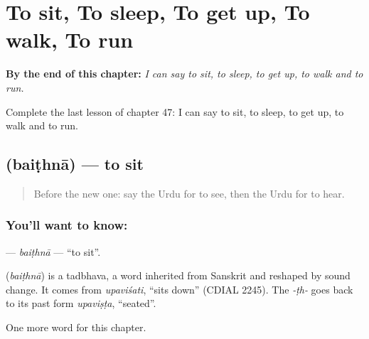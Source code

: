 
\chapter{To sit, To sleep, To get up, To walk, To run}
\label{ch:ur-to-sit-to-sleep-to-get-up-to-walk-to-run}

\begin{chapteropening}
\textbf{By the end of this chapter:} \emph{I can say to sit, to sleep, to get up, to walk and to run.}

Complete the last lesson of chapter 47: I can say to sit, to sleep, to get up, to walk and to run.
\end{chapteropening}

\section[\texorpdfstring{\ur{بیٹھنا} (baiṭhnā)}{بیٹھنا (baiṭhnā)}]{ (baiṭhnā) — to sit}

\label{lesson:UR-C47-baithna}



\begin{quote}
Before the new one: say the Urdu for to see, then the Urdu for to hear.
\end{quote}

\subsection*{You'll want to know: }
\textbf{} — \emph{baiṭhnā} — \textquotedblleft{}to sit\textquotedblright{}.

\begin{cousinweb}
\textbf{} (\emph{baiṭhnā}) is a tadbhava, a word inherited from Sanskrit and reshaped by sound change. It comes from \emph{upaviśati}, \textquotedblleft{}sits down\textquotedblright{} (CDIAL 2245). The \emph{-ṭh-} goes back to its past form \emph{upaviṣṭa}, \textquotedblleft{}seated\textquotedblright{}.
\end{cousinweb}

\begin{grammarlens}[title={What you've built}]
One more word for this chapter.
\end{grammarlens}


